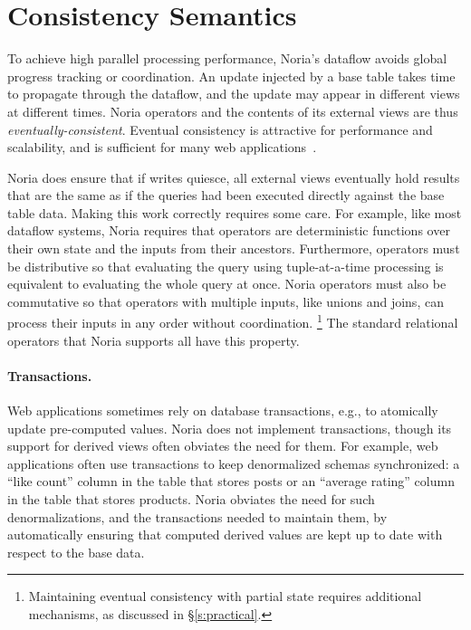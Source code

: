 \section{Consistency Semantics}

To achieve high parallel processing performance, Noria's dataflow avoids
global progress tracking or coordination. An update injected by a base table
takes time to propagate through the dataflow, and the update may appear in
different views at different times. Noria operators and the contents of its
external views are thus \emph{eventually-consistent}. Eventual consistency is
attractive for performance and scalability, and is sufficient for many web
applications~\cite{eventually-consistent, memcached-facebook, pnuts}.

Noria does ensure that if writes quiesce, all external views eventually hold
results that are the same as if the queries had been executed directly against
the base table data. Making this work correctly requires some care. For example,
like most dataflow systems, Noria requires that operators are deterministic
functions over their own state and the inputs from their ancestors. Furthermore,
operators must be distributive so that evaluating the query using
tuple-at-a-time processing is equivalent to evaluating the whole query at once.
Noria operators must also be commutative so that operators with multiple inputs,
like unions and joins, can process their inputs in any order without
coordination.%
\footnote{Maintaining eventual consistency with partial state requires
additional mechanisms, as discussed in \S\ref{s:practical}.}
The standard relational operators that Noria supports all have this property.

\paragraph{Transactions.}
Web applications sometimes rely on database transactions, e.g., to atomically
update pre-computed values. Noria does not implement transactions, though its
support for derived views often obviates the need for them. For example, web
applications often use transactions to keep denormalized schemas synchronized: a
``like count'' column in the table that stores posts or an ``average rating''
column in the table that stores products. Noria obviates the need for such
denormalizations, and the transactions needed to maintain them, by automatically
ensuring that computed derived values are kept up to date with respect to the
base data.

